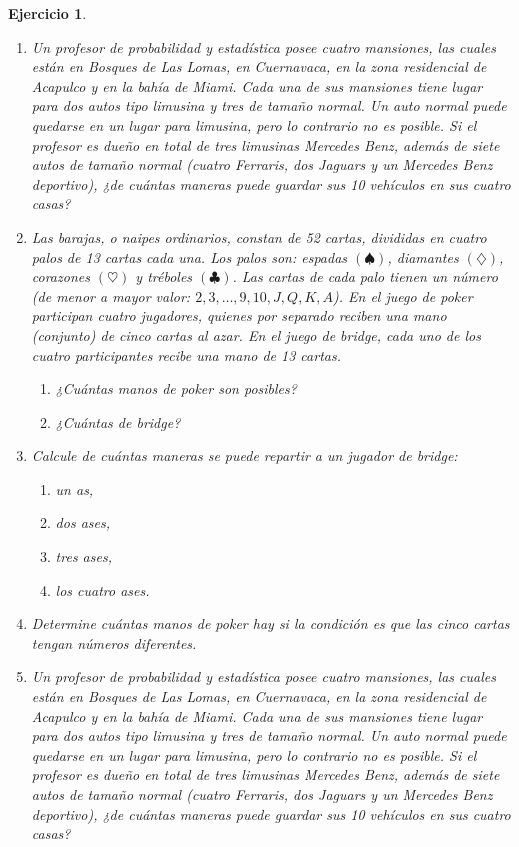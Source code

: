 \documentclass[12pt,twoside]{article}
\newtheorem{Ejer}{Ejercicio}
\begin{document}
\begin{Ejer}
\begin{enumerate}
\item Un profesor de probabilidad y estadística posee cuatro mansiones, las cuales están en Bosques de Las Lomas, en Cuernavaca, en la zona residencial de Acapulco y en la bahía de Miami. Cada una de sus mansiones tiene lugar para dos autos tipo limusina y tres de tamaño normal. Un auto normal puede quedarse en un lugar para limusina, pero lo contrario no es posible. Si el profesor es dueño en total de tres limusinas Mercedes Benz, además de siete autos de tamaño normal (cuatro Ferraris, dos Jaguars y un Mercedes Benz deportivo), ¿de cuántas maneras puede guardar sus 10 vehículos en sus cuatro casas?

\item Las barajas, o naipes ordinarios, constan de 52 cartas, divididas en cuatro palos de 13 cartas cada una. Los palos son: espadas $(\spadesuit)$, diamantes $(\diamondsuit)$, corazones $(\heartsuit)$ y tréboles $(\clubsuit)$. Las cartas de cada palo tienen un número (de menor a mayor valor: $2,3,\dots,9,10,J,Q,K,A$). En el juego de poker participan cuatro jugadores, quienes por separado reciben una mano (conjunto) de cinco cartas al azar. En el juego de bridge, cada uno de los cuatro participantes recibe una mano de 13 cartas.
\begin{enumerate}
\item ¿Cuántas manos de poker son posibles?
\item ¿Cuántas de bridge?
\end{enumerate}

\item Calcule de cuántas maneras se puede repartir a un jugador de bridge:
\begin{enumerate}
\item un as,
\item dos ases,
\item tres ases,
\item los cuatro ases.
\end{enumerate}

\item Determine cuántas manos de poker hay si la condición es que las cinco cartas tengan números diferentes.

\item Un profesor de probabilidad y estadística posee cuatro mansiones, las cuales están en Bosques de Las Lomas, en Cuernavaca, en la zona residencial de Acapulco y en la bahía de Miami. Cada una de sus mansiones tiene lugar para dos autos tipo limusina y tres de tamaño normal. Un auto normal puede quedarse en un lugar para limusina, pero lo contrario no es posible. Si el profesor es dueño en total de tres limusinas Mercedes Benz, además de siete autos de tamaño normal (cuatro Ferraris, dos Jaguars y un Mercedes Benz deportivo), ¿de cuántas maneras puede guardar sus 10 vehículos en sus cuatro casas?


\end{enumerate}
\end{Ejer}
\end{document}

